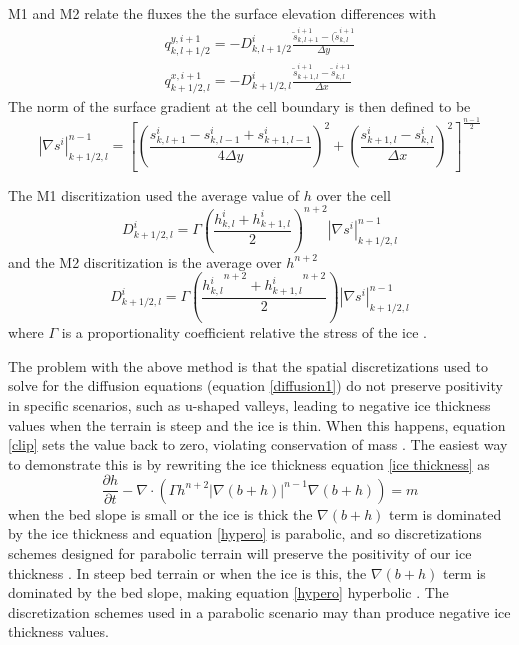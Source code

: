 \documentclass{article}
\begin{document}
M1 and M2 relate the fluxes the the surface elevation differences with
\begin{subequations}
\begin{gather}
    q^{y, i+1}_{k, l+1/2}=-D^i_{k, l+1/2}\frac{\tilde{s}^{i+1}_{k, l+1}-(\tilde{s}^{i+1}_{k, l}}{\Delta y} \\
    q^{x, i+1}_{k+1/2, l}=-D^i_{k+1/2, l}\frac{\tilde{s}^{i+1}_{k+1, l}-\tilde{s}^{i+1}_{k, l}}{\Delta x}
\end{gather}
\end{subequations}
The norm of the surface gradient at the cell boundary is then defined to be 
\begin{equation}
    |\nabla s ^i|^{n-1}_{k+1/2,l} = \left[\left( \frac{s^i_{k,l+1}-s^i_{k,l-1}+s^i_{k+1,l-1}}{4\Delta y}\right)^2+\left( \frac{s^i_{k+1,l}-s^i_{k,l}}{\Delta x}\right)^2 \right]^{\frac{n-1}{2}}
\end{equation}


The M1 discritization used the average value of $h$ over the cell
\begin{equation}
    D^i_{k+1/2,l}=\Gamma\left(\frac{h^i_{k,l}+h^i_{k+1,l}}{2}\right)^{n+2}|\nabla s ^i|^{n-1}_{k+1/2,l}
\end{equation}
and the M2 discritization is the average over $h^{n+2}$
\begin{equation}
    D^i_{k+1/2,l}=\Gamma\left(\frac{{h^i_{k,l}}^{n+2}+{h^i_{k+1,l}}^{n+2}}{2}\right)|\nabla s ^i|^{n-1}_{k+1/2,l}
\end{equation}
where $\Gamma$ is a proportionality coefficient relative the stress of the ice \citep{Jarosch2013}. 

The problem with the above method is that the spatial discretizations used to solve for the diffusion equations (equation \ref{diffusion1}) do not preserve positivity in specific scenarios, such as u-shaped valleys, leading to negative ice thickness values when the terrain is steep and the ice is thin. When this happens, equation \ref{clip} sets the value back to zero, violating conservation of mass \citep{Jarosch2013, Hindmarsh1996}. The easiest way to demonstrate this is by rewriting the ice thickness equation \ref{ice thickness} as
\begin{equation}\label{hypero}
\frac{\partial h}{\partial t} - \nabla \cdot \left( \Gamma h^{n+2} |\nabla(b+h)|^{n-1}\nabla(b+h)\right) =m
\end{equation}
when the bed slope is small or the ice is thick the  $\nabla(b+h)$ term is dominated by the ice thickness and equation \ref{hypero} is parabolic, and so discretizations schemes designed for parabolic terrain will preserve the positivity of our ice thickness \cite{Jarosch2013}. In steep bed terrain or when the ice is this, the $\nabla(b+h)$ term is dominated by the bed slope, making equation \ref{hypero} hyperbolic \cite{Jarosch2013}. The discretization schemes used in a parabolic scenario may than produce negative ice thickness values.
\end{document}
